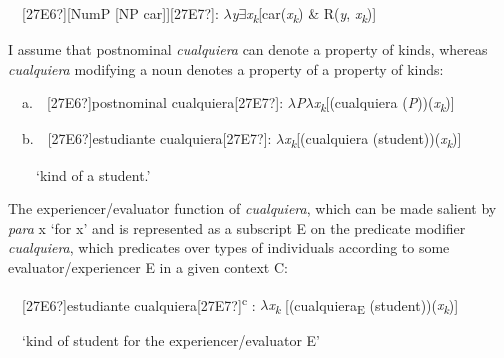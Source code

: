 \begin{styleStandard}
\label{bkm:Ref42889808}\ \ [27E6?][NumP [NP car]][27E7?]: $\lambda $\textit{y}${\exists}$\textit{x}\textit{\textsubscript{k}}[car(\textit{x}\textit{\textsubscript{k}}) \& R(\textit{y}, \textit{x}\textit{\textsubscript{k}})]
\end{styleStandard}

\begin{styleStandard}
I assume that postnominal \textit{cualquiera} can denote a property of kinds, whereas \textit{cualquiera} modifying a noun denotes a property of a property of kinds:
\end{styleStandard}

\begin{styleStandard}
\ \ a.\ \ [27E6?]postnominal cualquiera[27E7?]: $\lambda $\textit{P}$\lambda $\textit{x}\textit{\textsubscript{k}}[(cualquiera (\textit{P}))(\textit{x}\textit{\textsubscript{k}})]
\end{styleStandard}

\begin{styleStandard}
\ \ b.\ \ [27E6?]estudiante cualquiera[27E7?]:\textit{ }$\lambda $\textit{x}\textit{\textsubscript{k}}[(cualquiera (student))(\textit{x}\textit{\textsubscript{k}})]
\end{styleStandard}

\begin{styleStandard}
\ \ \ \ ‘kind of a student.’
\end{styleStandard}

\begin{styleStandard}
The experiencer/evaluator function of \textit{cualquiera}, which can be made salient by \textit{para }x\textit{ }‘for x’ and is represented as a subscript E on the predicate modifier \textit{cualquiera}, which predicates over types of individuals according to some evaluator/experiencer E in a given context C:
\end{styleStandard}

\begin{styleStandard}
\ \ [27E6?]estudiante cualquiera[27E7?]\textsuperscript{c} :\textit{ }$\lambda $\textit{x}\textit{\textsubscript{k }}[(cualquiera\textsubscript{E} (student))(\textit{x}\textit{\textsubscript{k}})] 
\end{styleStandard}

\begin{styleStandard}
\ \ ‘kind of student for the experiencer/evaluator E’
\end{styleStandard}

